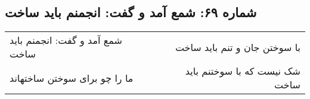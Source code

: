 \begin{center}
\section*{شماره ۶۹: شمع آمد و گفت: انجمنم باید ساخت}
\label{sec:069}
\begin{longtable}{l p{0.5cm} r}
شمع آمد و گفت: انجمنم باید ساخت
&&
با سوختن جان و تنم باید ساخت
\\
ما را چو برای سوختن ساختهاند
&&
شک نیست که با سوختنم باید ساخت
\\
\end{longtable}
\end{center}
